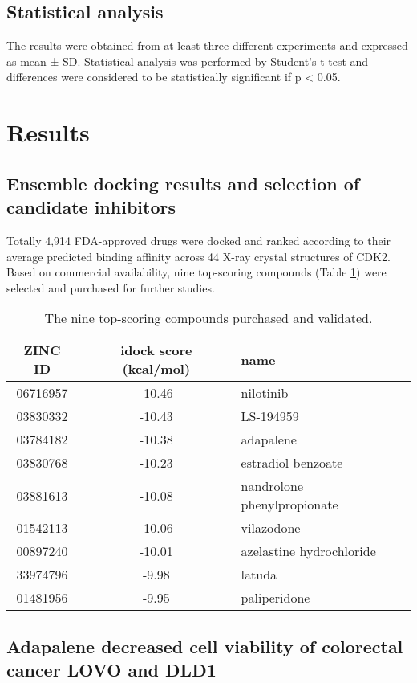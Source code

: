 \subsection{Statistical analysis}

The results were obtained from at least three different experiments and expressed as mean ± SD. Statistical analysis was performed by Student’s t test and differences were considered to be statistically significant if p < 0.05.

\section{Results}

\subsection{Ensemble docking results and selection of candidate inhibitors}

Totally 4,914 FDA-approved drugs were docked and ranked according to their average predicted binding affinity across 44 X-ray crystal structures of CDK2. Based on commercial availability, nine top-scoring compounds (Table \ref{cdk2:Top9}) were selected and purchased for further studies.

\begin{table}
\caption{The nine top-scoring compounds purchased and validated.}
\label{cdk2:Top9}
\begin{tabular}{ccl}
\hline
ZINC ID & idock score (kcal/mol) & name\\
\hline
06716957 & -10.46 & nilotinib\\
03830332 & -10.43 & LS-194959\\
03784182 & -10.38 & adapalene\\
03830768 & -10.23 & estradiol benzoate\\
03881613 & -10.08 & nandrolone phenylpropionate\\
01542113 & -10.06 & vilazodone\\
00897240 & -10.01 & azelastine hydrochloride\\
33974796 &  -9.98 & latuda\\
01481956 &  -9.95 & paliperidone\\
\hline
\end{tabular}
\end{table}

\subsection{Adapalene decreased cell viability of colorectal cancer LOVO and DLD1}

